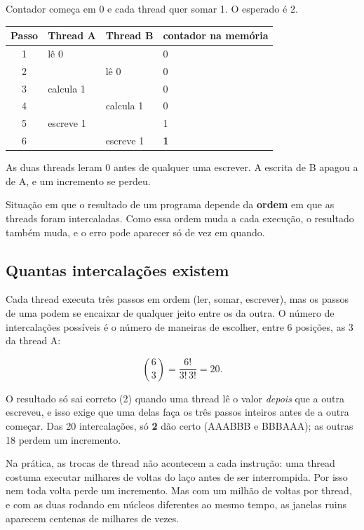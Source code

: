 \documentclass[11pt,a4paper]{article}
\begin{document}
Contador começa em 0 e cada thread quer somar 1. O esperado é 2.

\begin{center}
\begin{tabular}{@{}clll@{}}
\toprule
\textbf{Passo} & \textbf{Thread A} & \textbf{Thread B} & \textbf{contador na memória} \\
\midrule
1 & lê 0 & & 0 \\
2 & & lê 0 & 0 \\
3 & calcula 1 & & 0 \\
4 & & calcula 1 & 0 \\
5 & escreve 1 & & 1 \\
6 & & escreve 1 & \textbf{1} \\
\bottomrule
\end{tabular}
\end{center}

As duas threads leram 0 antes de qualquer uma escrever. A escrita de B apagou a de A, e um incremento se perdeu.

\begin{definicao}
Situação em que o resultado de um programa depende da \textbf{ordem} em que as threads foram intercaladas. Como essa ordem muda a cada execução, o resultado também muda, e o erro pode aparecer só de vez em quando.
\end{definicao}

\subsection{Quantas intercalações existem}

Cada thread executa três passos em ordem (ler, somar, escrever), mas os passos de uma podem se encaixar de qualquer jeito entre os da outra. O número de intercalações possíveis é o número de maneiras de escolher, entre 6 posições, as 3 da thread A:

\[
\binom{6}{3} = \frac{6!}{3!\,3!} = 20.
\]

O resultado só sai correto (2) quando uma thread lê o valor \emph{depois} que a outra escreveu, e isso exige que uma delas faça os três passos inteiros antes de a outra começar. Das 20 intercalações, só \textbf{2} dão certo (AAABBB e BBBAAA); as outras 18 perdem um incremento.

Na prática, as trocas de thread não acontecem a cada instrução: uma thread costuma executar milhares de voltas do laço antes de ser interrompida. Por isso nem toda volta perde um incremento. Mas com um milhão de voltas por thread, e com as duas rodando em núcleos diferentes ao mesmo tempo, as janelas ruins aparecem centenas de milhares de vezes.
\end{document}
